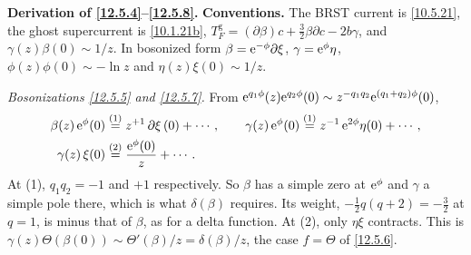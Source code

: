 \begin{tcolorbox}[breakable]
	\begin{remark}
		\textbf{Derivation of \eqref{12.5.4}--\eqref{12.5.8}.} \textbf{Conventions.} The BRST current is \eqref{10.5.21}, the ghost supercurrent is \eqref{10.1.21b}, $T_{F}^{\mathrm g}=(\partial\beta)c+\frac32\beta\partial c-2b\gamma$, and $\gamma(z)\beta(0)\sim1/z$. In bosonized form $\beta=\mathrm{e}^{-\phi}\partial\xi$, $\gamma=\mathrm{e}^{\phi}\eta$, $\phi(z)\phi(0)\sim-\ln z$ and $\eta(z)\xi(0)\sim1/z$.

		\emph{Bosonizations \eqref{12.5.5} and \eqref{12.5.7}.} From $\mathrm{e}^{q_{1}\phi}(z)\mathrm{e}^{q_{2}\phi}(0)\sim z^{-q_{1}q_{2}}\mathrm{e}^{(q_{1}+q_{2})\phi}(0)$,
		\begin{align*}
			\beta(z)\,\mathrm{e}^{\phi}(0)&\overset{(1)}{=} z^{+1}\,\partial\xi\,(0)+\cdots ,\qquad
			\gamma(z)\,\mathrm{e}^{\phi}(0)\overset{(1)}{=} z^{-1}\,\mathrm{e}^{2\phi}\eta(0)+\cdots ,\\
			\gamma(z)\,\xi(0)&\overset{(2)}{=} \frac{\mathrm{e}^{\phi}(0)}{z}+\cdots .
		\end{align*}
		At (1), $q_{1}q_{2}=-1$ and $+1$ respectively. So $\beta$ has a simple zero at $\mathrm{e}^{\phi}$ and $\gamma$ a simple pole there, which is what $\delta(\beta)$ requires. Its weight, $-\frac12q(q+2)=-\frac32$ at $q=1$, is minus that of $\beta$, as for a delta function. At (2), only $\eta\xi$ contracts. This is $\gamma(z)\Theta(\beta(0))\sim\Theta'(\beta)/z=\delta(\beta)/z$, the case $f=\Theta$ of \eqref{12.5.6}.


\end{remark}
\end{tcolorbox}
